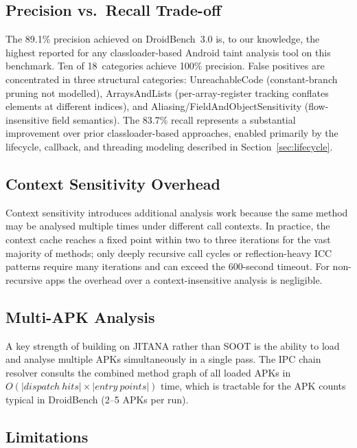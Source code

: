 \documentclass[conference]{IEEEtran}
\begin{document}
\subsection{Precision vs.\ Recall Trade-off}

The 89.1\% precision achieved on DroidBench~3.0 is, to our knowledge, the
highest reported for any classloader-based Android taint analysis tool on this
benchmark. Ten of 18~categories achieve 100\% precision. False positives are
concentrated in three structural categories: UnreachableCode (constant-branch
pruning not modelled), ArraysAndLists (per-array-register tracking conflates
elements at different indices), and Aliasing/FieldAndObjectSensitivity
(flow-insensitive field semantics). The 83.7\% recall represents a substantial
improvement over prior classloader-based approaches, enabled primarily by the
lifecycle, callback, and threading modeling described in Section~\ref{sec:lifecycle}.

\subsection{Context Sensitivity Overhead}

Context sensitivity introduces additional analysis work because the same method
may be analysed multiple times under different call contexts. In practice, the
context cache reaches a fixed point within two to three iterations for the vast
majority of methods; only deeply recursive call cycles or reflection-heavy ICC
patterns require many iterations and can exceed the 600-second timeout. For
non-recursive apps the overhead over a context-insensitive analysis is negligible.

\subsection{Multi-APK Analysis}

A key strength of building on JITANA rather than SOOT is the ability to load and
analyse multiple APKs simultaneously in a single pass. The IPC chain resolver
consults the combined method graph of all loaded APKs in $O(|\mathit{dispatch\
hits}| \times |\mathit{entry\ points}|)$ time, which is tractable for the APK
counts typical in DroidBench (2--5 APKs per run).

\subsection{Limitations}
\end{document}
